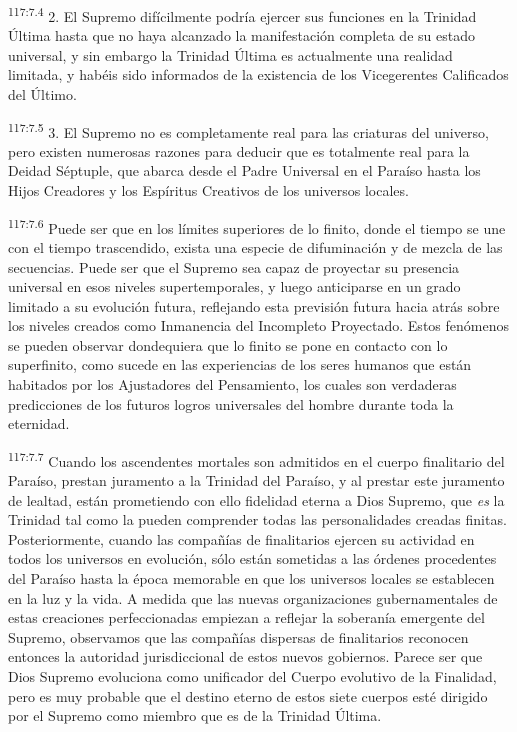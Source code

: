 \documentclass[twoside, 11pt]{book}
\begin{document}
\par
\textsuperscript{117:7.4} 2. El Supremo difícilmente podría ejercer sus funciones en la Trinidad Última hasta que no haya alcanzado la manifestación completa de su estado universal, y sin embargo la Trinidad Última es actualmente una realidad limitada, y habéis sido informados de la existencia de los Vicegerentes Calificados del Último.

\par
\textsuperscript{117:7.5} 3. El Supremo no es completamente real para las criaturas del universo, pero existen numerosas razones para deducir que es totalmente real para la Deidad Séptuple, que abarca desde el Padre Universal en el Paraíso hasta los Hijos Creadores y los Espíritus Creativos de los universos locales.

\par
\textsuperscript{117:7.6} Puede ser que en los límites superiores de lo finito, donde el tiempo se une con el tiempo trascendido, exista una especie de difuminación y de mezcla de las secuencias. Puede ser que el Supremo sea capaz de proyectar su presencia universal en esos niveles supertemporales, y luego anticiparse en un grado limitado a su evolución futura, reflejando esta previsión futura hacia atrás sobre los niveles creados como Inmanencia del Incompleto Proyectado. Estos fenómenos se pueden observar dondequiera que lo finito se pone en contacto con lo superfinito, como sucede en las experiencias de los seres humanos que están habitados por los Ajustadores del Pensamiento, los cuales son verdaderas predicciones de los futuros logros universales del hombre durante toda la eternidad.

\par
\textsuperscript{117:7.7} Cuando los ascendentes mortales son admitidos en el cuerpo finalitario del Paraíso, prestan juramento a la Trinidad del Paraíso, y al prestar este juramento de lealtad, están prometiendo con ello fidelidad eterna a Dios Supremo, que \textit{es} la Trinidad tal como la pueden comprender todas las personalidades creadas finitas. Posteriormente, cuando las compañías de finalitarios ejercen su actividad en todos los universos en evolución, sólo están sometidas a las órdenes procedentes del Paraíso hasta la época memorable en que los universos locales se establecen en la luz y la vida. A medida que las nuevas organizaciones gubernamentales de estas creaciones perfeccionadas empiezan a reflejar la soberanía emergente del Supremo, observamos que las compañías dispersas de finalitarios reconocen entonces la autoridad jurisdiccional de estos nuevos gobiernos. Parece ser que Dios Supremo evoluciona como unificador del Cuerpo evolutivo de la Finalidad, pero es muy probable que el destino eterno de estos siete cuerpos esté dirigido por el Supremo como miembro que es de la Trinidad Última.
\end{document}
